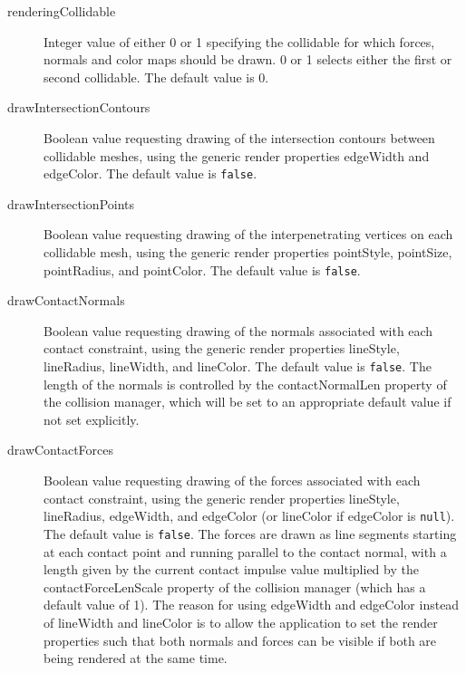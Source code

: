 \begin{description}

\item[renderingCollidable]\mbox{}

Integer value of either 0 or 1 specifying the collidable for which
forces, normals and color maps should be drawn. 0 or 1 selects either
the first or second collidable. The default value is 0.

\item[drawIntersectionContours]\mbox{}

Boolean value requesting drawing of the intersection contours between
collidable meshes, using the generic render properties {\sf edgeWidth}
and {\sf edgeColor}. The default value is {\tt false}.

\item[drawIntersectionPoints]\mbox{}

Boolean value requesting drawing of the interpenetrating vertices on
each collidable mesh, using the generic render properties {\sf
pointStyle}, {\sf pointSize}, {\sf pointRadius}, and {\sf pointColor}.
The default value is {\tt false}.

\item[drawContactNormals]\mbox{}

Boolean value requesting drawing of the normals associated with each
contact constraint, using the generic render properties {\sf
lineStyle}, {\sf lineRadius}, {\sf lineWidth}, and {\sf lineColor}.
The default value is {\tt false}. The length of the normals is
controlled by the {\sf contactNormalLen} property of the collision
manager, which will be set to an appropriate default value if not set
explicitly.

\item[drawContactForces]\mbox{}

Boolean value requesting drawing of the forces associated with each
contact constraint, using the generic render properties {\sf
lineStyle}, {\sf lineRadius}, {\sf edgeWidth}, and {\sf edgeColor} (or
{\sf lineColor} if {\sf edgeColor} is {\tt null}).  The default value
is {\tt false}. The forces are drawn as line segments starting at each
contact point and running parallel to the contact normal, with a
length given by the current contact impulse value multiplied by the
{\sf contactForceLenScale} property of the collision manager (which
has a default value of 1).  The reason for using {\sf edgeWidth} and
{\sf edgeColor} instead of {\sf lineWidth} and {\sf lineColor} is to
allow the application to set the render properties such that both
normals and forces can be visible if both are being rendered at the
same time.


\end{description}

